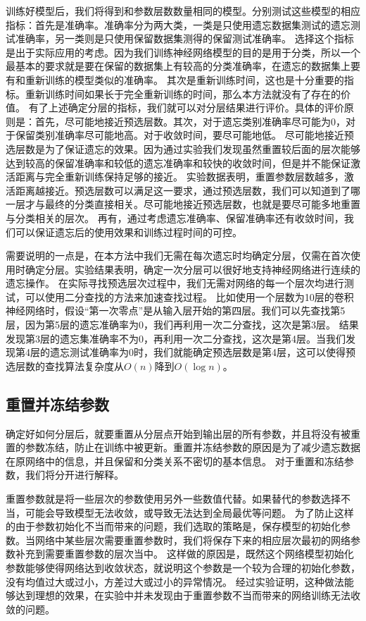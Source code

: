 训练好模型后，我们将得到和参数层数数量相同的模型。分别测试这些模型的相应指标：首先是准确率。准确率分为两大类，一类是只使用遗忘数据集测试的遗忘测试准确率，另一类则是只使用保留数据集测得的保留测试准确率。
选择这个指标是出于实际应用的考虑。因为我们训练神经网络模型的目的是用于分类，所以一个最基本的要求就是要在保留的数据集上有较高的分类准确率，在遗忘的数据集上要有和重新训练的模型类似的准确率。
其次是重新训练时间，这也是十分重要的指标。重新训练时间如果长于完全重新训练的时间，那么本方法就没有了存在的价值。
有了上述确定分层的指标，我们就可以对分层结果进行评价。具体的评价原则是：首先，尽可能地接近预选层数。其次，对于遗忘类别准确率尽可能为0，对于保留类别准确率尽可能地高。对于收敛时间，要尽可能地低。
尽可能地接近预选层数是为了保证遗忘的效果。因为通过实验我们发现虽然重置较后面的层次能够达到较高的保留准确率和较低的遗忘准确率和较快的收敛时间，但是并不能保证激活距离与完全重新训练保持足够的接近。
实验数据表明，重置参数层数越多，激活距离越接近。预选层数可以满足这一要求，通过预选层数，我们可以知道到了哪一层才与最终的分类直接相关。尽可能地接近预选层数，也就是要尽可能多地重置与分类相关的层次。
再有，通过考虑遗忘准确率、保留准确率还有收敛时间，我们可以保证遗忘后的使用效果和训练过程时间的可控。

需要说明的一点是，在本方法中我们无需在每次遗忘时均确定分层，仅需在首次使用时确定分层。实验结果表明，确定一次分层可以很好地支持神经网络进行连续的遗忘操作。
在实际寻找预选层次过程中，我们无需对网络的每一个层次均进行测试，可以使用二分查找的方法来加速查找过程。
比如使用一个层数为10层的卷积神经网络时，假设“第一次零点”是从输入层开始的第四层。我们可以先查找第5层，因为第5层的遗忘准确率为0，我们再利用一次二分查找，这次是第3层。
结果发现第3层的遗忘集准确率不为0，再利用一次二分查找，这次是第4层。当我们发现第4层的遗忘测试准确率为0时，我们就能确定预选层数是第4层，这可以使得预选层数的查找算法复杂度从$O(n)$降到$O(\log n)$。

\subsection{重置并冻结参数}
确定好如何分层后，就要重置从分层点开始到输出层的所有参数，并且将没有被重置的参数冻结，防止在训练中被更新。重置并冻结参数的原因是为了减少遗忘数据在原网络中的信息，并且保留和分类关系不密切的基本信息。
对于重置和冻结参数，我们将分开进行解释。

重置参数就是将一些层次的参数使用另外一些数值代替。如果替代的参数选择不当，可能会导致模型无法收敛，或导致无法达到全局最优等问题。
为了防止这样的由于参数初始化不当而带来的问题，我们选取的策略是，保存模型的初始化参数。当网络中某些层次需要重置参数时，我们将保存下来的相应层次最初的网络参数补充到需要重置参数的层次当中。
这样做的原因是，既然这个网络模型初始化参数能够使得网络达到收敛状态，就说明这个参数是一个较为合理的初始化参数，没有均值过大或过小，方差过大或过小的异常情况。
经过实验证明，这种做法能够达到理想的效果，在实验中并未发现由于重置参数不当而带来的网络训练无法收敛的问题。

